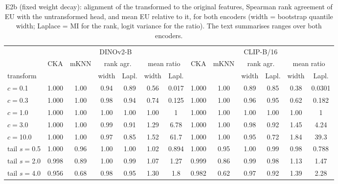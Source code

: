 \begin{table}[t]
\centering
\caption{E2b (fixed weight decay): alignment of the transformed to the original features, Spearman rank agreement of EU with the untransformed head, and mean EU relative to it, for both encoders (width = bootstrap quantile width; Laplace = MI for the rank, logit variance for the ratio). The text summarises ranges over both encoders.}
\label{tab:e2b}
\setlength{\tabcolsep}{3pt}
\small
\begin{tabular}{lcccccccccccc}
\toprule
 & \multicolumn{6}{c}{DINOv2-B} & \multicolumn{6}{c}{CLIP-B/16} \\ \cmidrule(lr){2-7}\cmidrule(lr){8-13}
 & CKA & mKNN & \multicolumn{2}{c}{rank agr.} & \multicolumn{2}{c}{mean ratio} & CKA & mKNN & \multicolumn{2}{c}{rank agr.} & \multicolumn{2}{c}{mean ratio} \\
transform & & & width & Lapl. & width & Lapl. & & & width & Lapl. & width & Lapl. \\
\midrule
$c=$0.1 & 1.000 & 1.00 & 0.94 & 0.89 & 0.56 & 0.017 & 1.000 & 1.00 & 0.89 & 0.85 & 0.38 & 0.0301 \\
$c=$0.3 & 1.000 & 1.00 & 0.98 & 0.94 & 0.74 & 0.125 & 1.000 & 1.00 & 0.96 & 0.95 & 0.62 & 0.182 \\
$c=$1.0 & 1.000 & 1.00 & 1.00 & 1.00 & 1.00 & 1 & 1.000 & 1.00 & 1.00 & 1.00 & 1.00 & 1 \\
$c=$3.0 & 1.000 & 1.00 & 0.99 & 0.91 & 1.29 & 6.78 & 1.000 & 1.00 & 0.98 & 0.92 & 1.45 & 4.24 \\
$c=$10.0 & 1.000 & 1.00 & 0.97 & 0.85 & 1.52 & 61.7 & 1.000 & 1.00 & 0.95 & 0.72 & 1.84 & 39.3 \\
tail $s=$0.5 & 1.000 & 0.96 & 1.00 & 1.00 & 1.02 & 0.894 & 1.000 & 0.95 & 1.00 & 0.99 & 0.98 & 0.788 \\
tail $s=$2.0 & 0.998 & 0.89 & 1.00 & 0.99 & 1.07 & 1.27 & 0.999 & 0.86 & 0.99 & 0.98 & 1.13 & 1.47 \\
tail $s=$4.0 & 0.956 & 0.68 & 0.98 & 0.95 & 1.30 & 1.8 & 0.982 & 0.62 & 0.97 & 0.92 & 1.39 & 2.28 \\
\bottomrule
\end{tabular}
\end{table}